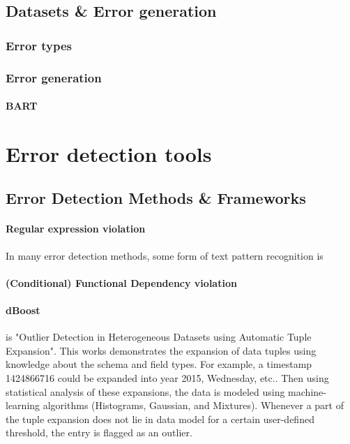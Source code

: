 \subsection{Datasets \& Error generation}
\subsubsection{Error types}

\subsubsection{Error generation}
\paragraph{BART}


\section{Error detection tools}

\subsection{Error Detection Methods \& Frameworks}


\paragraph{Regular expression violation}
In many error detection methods, some form of text pattern recognition is 
    
\paragraph{(Conditional) Functional Dependency violation}




\paragraph{dBoost \cite{Pit--Claudel2016-dj}} is "Outlier Detection in Heterogeneous Datasets using Automatic Tuple Expansion". This works demonstrates the expansion of data tuples using knowledge about the schema and field types. For example, a timestamp 1424866716 could be expanded into year 2015, Wednesday, etc.. Then using statistical analysis of these expansions, the data is modeled using machine-learning
algorithms (Histograms, Gaussian, and Mixtures). Whenever a part of the tuple expansion does not lie in data model for a certain user-defined threshold, the entry is flagged as an outlier.



